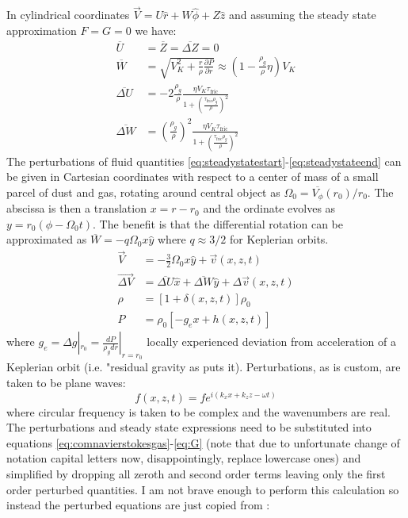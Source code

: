 \documentclass[12pt]{article}
\begin{document}
In cylindrical coordinates $\vec{V} = U\hat r + W\hat\phi + Z\hat z$ and assuming the steady state approximation $F=G=0$ we have:
\begin{align}
    \label{eq:steadystatestart}
    \overline{U} &= \overline{Z} = \overline{\Delta Z} = 0 \\
    \overline{W} &= \sqrt{ V_K^2 + \frac{r}{\rho}\frac{\partial P}{\partial r} } \approx \left( 1-\frac{\rho_g}{\rho}\eta\right)V_K \\
    \overline{\Delta U} &= -2 \frac{\rho_g}{\rho} \frac{\eta V_K\tau_\mathrm{fric}}{1 + \left(\frac{\tau_\mathrm{fric}\rho_g}{\rho}\right)^2 } \\
    \overline{\Delta W} &= \left(\frac{\rho_g}{\rho}\right)^2 \frac{\eta V_K\tau_\mathrm{fric}}{1 + \left(\frac{\tau_\mathrm{fric}\rho_g}{\rho}\right)^2 }
    \label{eq:steadystateend}
\end{align}
The perturbations of fluid quantities \ref{eq:steadystatestart}-\ref{eq:steadystateend} can be given in Cartesian coordinates with respect to a center of mass of a small parcel of dust and gas, rotating around central object as $\Omega_0 = \overline{V_\phi}(r_0)/r_0$. The abscissa is then a translation $x=r-r_0$ and the ordinate evolves as $y=r_0(\phi-\Omega_0t)$. The benefit is that the differential rotation can be approximated as $\overline{W} = -q\Omega_0x\hat y$ where $q\approx 3/2$ for Keplerian orbits. 
\begin{align}
    \vec{V} &= -\frac{3}{2}\Omega_0x\hat{y} + \vec{v}(x,z,t) \\
    \vec{\Delta V} &= \overline{\Delta U}\hat x + \overline{\Delta W}\hat y + \Delta\vec{v}(x,z,t)\\
    \rho &= [1+\delta(x,z,t)]\rho_0 \\
    P &= \rho_0[-g_ex + h(x,z,t)]
\end{align}
where $g_e = \Delta g|_{r_0} = \frac{dP}{\rho_gdr}|_{r=r_0}$ locally experienced deviation from acceleration of a Keplerian orbit (i.e. "residual gravity as \cite{Weidenschilling77} puts it). Perturbations, as is custom, are taken to be plane waves: 
\begin{equation}
f(x,z,t) = fe^{i(k_xx + k_zz - \omega t)}
\end{equation}
where circular frequency is taken to be complex and the wavenumbers are real. The perturbations and steady state expressions need to be substituted into equations \ref{eq:comnavierstokesgas}-\ref{eq:G} (note that due to unfortunate change of notation capital letters now, disappointingly, replace lowercase ones) and simplified by dropping all zeroth and second order terms leaving only the first order perturbed quantities. I am not brave enough to perform this calculation so instead the perturbed equations are just copied from \cite{Youdin05}:
\end{document}
